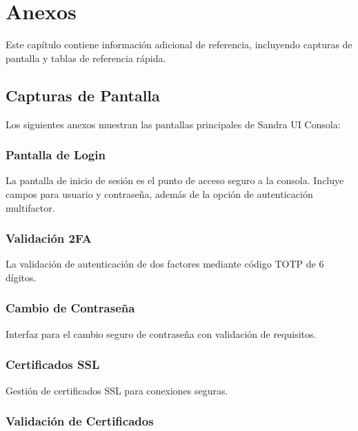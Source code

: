 
\chapter{Anexos}

Este capítulo contiene información adicional de referencia, incluyendo capturas de pantalla y tablas de referencia rápida.

\section{Capturas de Pantalla}

Los siguientes anexos muestran las pantallas principales de Sandra UI Consola:

\subsection{Pantalla de Login}

La pantalla de inicio de sesión es el punto de acceso seguro a la consola. Incluye campos para usuario y contraseña, además de la opción de autenticación multifactor.

\subsection{Validación 2FA}

La validación de autenticación de dos factores mediante código TOTP de 6 dígitos.

\subsection{Cambio de Contraseña}

Interfaz para el cambio seguro de contraseña con validación de requisitos.

\subsection{Certificados SSL}

Gestión de certificados SSL para conexiones seguras.

\subsection{Validación de Certificados}

